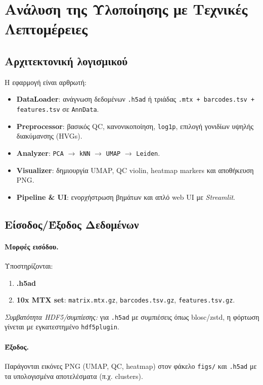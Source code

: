 \documentclass[12pt,a4paper]{article}
\begin{document}
\section{Ανάλυση της Υλοποίησης με Τεχνικές Λεπτομέρειες}

\subsection{Αρχιτεκτονική λογισμικού}
Η εφαρμογή είναι αρθρωτή:
\begin{itemize}
  \item \textbf{DataLoader}: ανάγνωση δεδομένων \texttt{.h5ad} ή τριάδας \texttt{.mtx + barcodes.tsv + features.tsv} σε \texttt{AnnData}.
  \item \textbf{Preprocessor}: βασικός QC, κανονικοποίηση, \texttt{log1p}, επιλογή γονιδίων υψηλής διακύμανσης (HVGs).
  \item \textbf{Analyzer}: \texttt{PCA} $\to$ \texttt{kNN} $\to$ \texttt{UMAP} $\to$ \texttt{Leiden}.
  \item \textbf{Visualizer}: δημιουργία UMAP, QC violin, heatmap markers και αποθήκευση PNG.
  \item \textbf{Pipeline \& UI}: ενορχήστρωση βημάτων και απλό web UI με \textit{Streamlit}.
\end{itemize}

\subsection{Είσοδος/Έξοδος Δεδομένων}
\paragraph{Μορφές εισόδου.} Υποστηρίζονται:
\begin{enumerate}[leftmargin=*]
  \item \textbf{{.h5ad}}
  \item \textbf{10x MTX set}: \texttt{matrix.mtx.gz}, \texttt{barcodes.tsv.gz}, \texttt{features.tsv.gz}.
\end{enumerate}
\noindent \textit{Συμβατότητα HDF5/συμπίεσης:} για \texttt{.h5ad} με συμπιέσεις όπως blosc/zstd, η φόρτωση γίνεται με εγκατεστημένο \texttt{hdf5plugin}.

\paragraph{Έξοδος.} Παράγονται εικόνες PNG (UMAP, QC, heatmap) στον φάκελο \texttt{figs/} και \texttt{.h5ad} με τα υπολογισμένα αποτελέσματα (π.χ. clusters).
\end{document}
